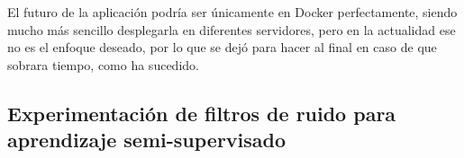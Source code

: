 El futuro de la aplicación podría ser únicamente en Docker perfectamente, siendo mucho más sencillo desplegarla en diferentes servidores, pero en la actualidad ese no es el enfoque deseado, por lo que se dejó para hacer al final en caso de que sobrara tiempo, como ha sucedido.


\subsection{Experimentación de filtros de ruido para aprendizaje semi-supervisado}
